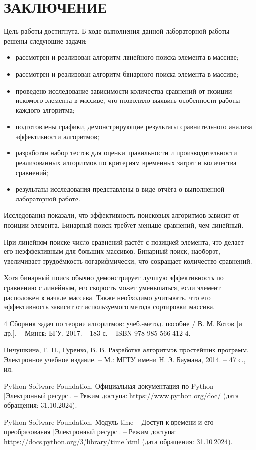 \documentclass[a4paper, 12pt]{extreport}
\begin{document}
\chapter*{ЗАКЛЮЧЕНИЕ}
Цель работы достигнута. В ходе выполнения данной лабораторной работы решены следующие задачи:
\begin{itemize}
    \item[--] рассмотрен и реализован алгоритм линейного поиска элемента в массиве;
    \item[--] рассмотрен и реализован алгоритм бинарного поиска элемента в массиве;
    \item[--] проведено исследование зависимости количества сравнений от позиции искомого элемента в массиве, что позволило выявить особенности работы каждого алгоритма;
    \item[--] подготовлены графики, демонстрирующие результаты сравнительного анализа эффективности алгоритмов;
    \item[--] разработан набор тестов для оценки правильности и производительности реализованных алгоритмов по критериям временных затрат и количества сравнений;
    \item[--] результаты исследования представлены в виде отчёта о выполненной лабораторной работе.
\end{itemize}
Исследования показали, что эффективность поисковых алгоритмов зависит от позиции элемента. Бинарный поиск требует меньше сравнений, чем линейный.

При линейном поиске число сравнений растёт с позицией элемента, что делает его неэффективным для больших массивов. Бинарный поиск, наоборот, увеличивает трудоёмкость логарифмически, что сокращает количество сравнений.

Хотя бинарный поиск обычно демонстрирует лучшую эффективность по сравнению с линейным, его скорость может уменьшаться, если элемент расположен в начале массива. Также необходимо учитывать, что его эффективность зависит от используемого метода сортировки массива.

\renewcommand{\bibname}{СПИСОК ИСПОЛЬЗОВАННЫХ ИСТОЧНИКОВ}
\begin{thebibliography}{4}
    Сборник задач по теории алгоритмов: учеб.-метод. пособие / В. М. Котов [и др.]. -- Минск: БГУ, 2017. -- 183 с. -- ISBN 978-985-566-412-4.

    Ничушкина, Т. Н., Гуренко, В. В. Разработка алгоритмов простейших программ: Электронное учебное издание. -- М.: МГТУ имени Н. Э. Баумана, 2014. -- 47 с., ил.

    Python Software Foundation. Официальная документация по Python [Электронный ресурс]. -- Режим доступа: \url{https://www.python.org/doc/} (дата обращения: 31.10.2024).

    Python Software Foundation. Модуль time -- Доступ к времени и его преобразования [Электронный ресурс]. -- Режим доступа: \url{https://docs.python.org/3/library/time.html} (дата обращения: 31.10.2024).
\end{thebibliography}


\end{document}
